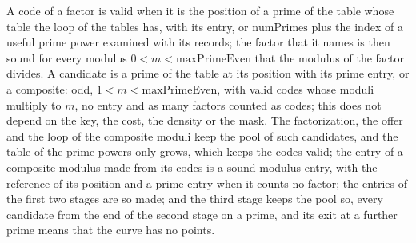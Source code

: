 \begin{lemma}\label{lem:compositeModuli}
  \leanok
  A code of a factor is valid when it is the position of a prime of the table whose table the loop
  of the tables has, with its entry, or $\mathrm{numPrimes}$ plus the index of a useful prime power
  examined with its records; the factor that it names is then sound for every modulus
  $0 < m < \mathrm{maxPrimeEven}$ that the modulus of the factor divides. A candidate is a prime of
  the table at its position with its prime entry, or a composite: odd,
  $1 < m < \mathrm{maxPrimeEven}$, with valid codes whose moduli multiply to $m$, no entry and as
  many factors counted as codes; this does not depend on the key, the cost, the density or the mask.
  The factorization, the offer and the loop of the composite moduli keep the pool of such
  candidates, and the table of the prime powers only grows, which keeps the codes valid; the entry
  of a composite modulus made from its codes is a sound modulus entry, with the reference of its
  position and a prime entry when it counts no factor; the entries of the first two stages are so
  made; and the third stage keeps the pool so, every candidate from the end of the second stage on a
  prime, and its exit at a further prime means that the curve has no points.
\end{lemma}

